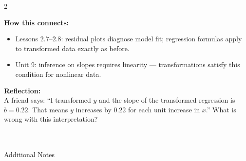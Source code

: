 \documentclass[10pt]{article}
\begin{document}
\vspace{0.1in}

\begin{spiralbox}
\small
\begin{multicols}{2}

\textbf{How this connects:}
\begin{itemize}[itemsep=3pt]
  \item Lessons 2.7--2.8: residual plots diagnose model fit; regression formulas apply
        to transformed data exactly as before.
  \item Unit 9: inference on slopes requires linearity --- transformations satisfy this
        condition for nonlinear data.
\end{itemize}

\columnbreak

\textbf{Reflection:}\\
A friend says: ``I transformed $y$ and the slope of the transformed regression is $b = 0.22$.
That means $y$ increases by 0.22 for each unit increase in $x$.'' What is wrong with this
interpretation?\\[2pt]
\writeline\\[1pt]\writeline\\[1pt]\writeline

\end{multicols}
\end{spiralbox}

\vspace{0.1in}

\begin{notesbox}{Additional Notes}
\vspace{0pt}
\writeline\\\writeline\\\writeline\\\writeline\\\writeline\\\writeline
\end{notesbox}
\end{document}
